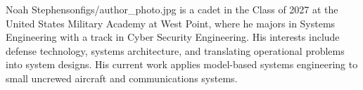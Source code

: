 \documentclass[twocolumn,letterpaper]{IEEEAerospaceCLS}
\begin{document}
\thebiography

\begin{biographywithpic}
{Noah Stephenson}{figs/author_photo.jpg}
is a cadet in the Class of 2027 at the United States Military Academy at West Point, where he majors in Systems Engineering with a track in Cyber Security Engineering. His interests include defense technology, systems architecture, and translating operational problems into system designs. His current work applies model-based systems engineering to small uncrewed aircraft and communications systems.
\end{biographywithpic}
\end{document}
